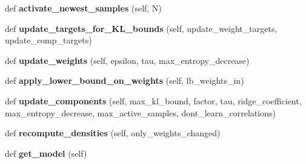 \begin{DoxyCompactItemize}
\item 
def {\bfseries activate\+\_\+newest\+\_\+samples} (self, N)\hypertarget{classVIPS__PythonWrapper_1_1VIPS__PythonWrapper_a80436aba4ac10a9ae4a858dd776daa46}{}\label{classVIPS__PythonWrapper_1_1VIPS__PythonWrapper_a80436aba4ac10a9ae4a858dd776daa46}

\item 
def {\bfseries update\+\_\+targets\+\_\+for\+\_\+\+K\+L\+\_\+bounds} (self, update\+\_\+weight\+\_\+targets, update\+\_\+comp\+\_\+targets)\hypertarget{classVIPS__PythonWrapper_1_1VIPS__PythonWrapper_a655ac6d10787d77209af115b7f9974aa}{}\label{classVIPS__PythonWrapper_1_1VIPS__PythonWrapper_a655ac6d10787d77209af115b7f9974aa}

\item 
def {\bfseries update\+\_\+weights} (self, epsilon, tau, max\+\_\+entropy\+\_\+decrease)\hypertarget{classVIPS__PythonWrapper_1_1VIPS__PythonWrapper_a22d9320a61ce3b417fd844f23496df95}{}\label{classVIPS__PythonWrapper_1_1VIPS__PythonWrapper_a22d9320a61ce3b417fd844f23496df95}

\item 
def {\bfseries apply\+\_\+lower\+\_\+bound\+\_\+on\+\_\+weights} (self, lb\+\_\+weights\+\_\+in)\hypertarget{classVIPS__PythonWrapper_1_1VIPS__PythonWrapper_a1c414ea0d6e4e499e1dec190a75e37c5}{}\label{classVIPS__PythonWrapper_1_1VIPS__PythonWrapper_a1c414ea0d6e4e499e1dec190a75e37c5}

\item 
def {\bfseries update\+\_\+components} (self, max\+\_\+kl\+\_\+bound, factor, tau, ridge\+\_\+coefficient, max\+\_\+entropy\+\_\+decrease, max\+\_\+active\+\_\+samples, dont\+\_\+learn\+\_\+correlations)\hypertarget{classVIPS__PythonWrapper_1_1VIPS__PythonWrapper_a67549b1db5ae4a85e93a75cf61f41ac6}{}\label{classVIPS__PythonWrapper_1_1VIPS__PythonWrapper_a67549b1db5ae4a85e93a75cf61f41ac6}

\item 
def {\bfseries recompute\+\_\+densities} (self, only\+\_\+weights\+\_\+changed)\hypertarget{classVIPS__PythonWrapper_1_1VIPS__PythonWrapper_af2603b54ce5770f30caaaedd0de39903}{}\label{classVIPS__PythonWrapper_1_1VIPS__PythonWrapper_af2603b54ce5770f30caaaedd0de39903}

\item 
def {\bfseries get\+\_\+model} (self)\hypertarget{classVIPS__PythonWrapper_1_1VIPS__PythonWrapper_a829dfd6a3314459908c09b0e717f7131}{}\label{classVIPS__PythonWrapper_1_1VIPS__PythonWrapper_a829dfd6a3314459908c09b0e717f7131}


\end{DoxyCompactItemize}
